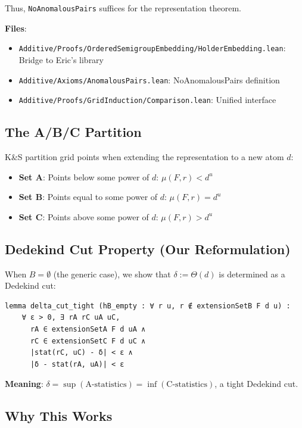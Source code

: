 \documentclass[11pt]{article}
\theoremstyle{definition}
\theoremstyle{remark}
\begin{document}
Thus, \texttt{NoAnomalousPairs} suffices for the representation theorem.

\textbf{Files}:
\begin{itemize}
\item \texttt{Additive/Proofs/OrderedSemigroupEmbedding/HolderEmbedding.lean}: Bridge to Eric's library
\item \texttt{Additive/Axioms/AnomalousPairs.lean}: NoAnomalousPairs definition
\item \texttt{Additive/Proofs/GridInduction/Comparison.lean}: Unified interface
\end{itemize}

\subsection{The A/B/C Partition}

K\&S partition grid points when extending the representation to a new atom $d$:
\begin{itemize}
\item \textbf{Set A}: Points below some power of $d$: $\mu(F, r) < d^u$
\item \textbf{Set B}: Points equal to some power of $d$: $\mu(F, r) = d^u$
\item \textbf{Set C}: Points above some power of $d$: $\mu(F, r) > d^u$
\end{itemize}

\subsection{Dedekind Cut Property (Our Reformulation)}

When $B = \emptyset$ (the generic case), we show that $\delta := \Theta(d)$ is determined as a Dedekind cut:

\begin{lstlisting}[caption={Dedekind cut tightness lemma}]
lemma delta_cut_tight (hB_empty : ∀ r u, r ∉ extensionSetB F d u) :
    ∀ ε > 0, ∃ rA rC uA uC,
      rA ∈ extensionSetA F d uA ∧
      rC ∈ extensionSetC F d uC ∧
      |stat(rC, uC) - δ| < ε ∧
      |δ - stat(rA, uA)| < ε
\end{lstlisting}

\textbf{Meaning}: $\delta = \sup(\text{A-statistics}) = \inf(\text{C-statistics})$, a tight Dedekind cut.

\subsection{Why This Works}
\end{document}
